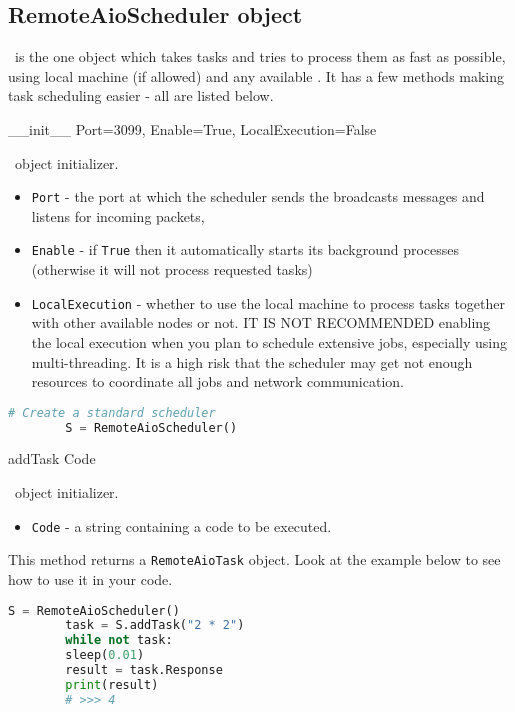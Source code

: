 \subsection{RemoteAioScheduler object}

\RemoteAioScheduler\ is the one object which takes tasks and tries to process them as fast as possible, using local machine (if allowed) and any available \RemoteAioNode. It has a few methods making task scheduling easier - all are listed below.

 {\_\_init\_\_} {Port=3099, Enable=True, LocalExecution=False} {
	\RemoteAioScheduler\ object initializer.
	\begin{itemize}
		\item \texttt{Port} - the port at which the scheduler sends the broadcasts messages and listens for incoming packets, 
		\item \texttt{Enable} - if \texttt{True} then it automatically starts its background processes (otherwise it will not process requested tasks)
		\item \texttt{LocalExecution} - whether to use the local machine to process tasks together with other available nodes or not. IT IS NOT RECOMMENDED enabling the local execution when you plan to schedule extensive jobs, especially using multi-threading. It is a high risk that the scheduler may get not enough resources to coordinate all jobs and network communication.
	\end{itemize}
}
\begin{lstlisting}[language=Python]
		# Create a standard scheduler
		S = RemoteAioScheduler()
\end{lstlisting}

 {addTask} {Code} {
	\RemoteAioScheduler\ object initializer.
	\begin{itemize}
		\item \texttt{Code} - a string containing a code to be executed.
	\end{itemize}
	This method returns a \texttt{RemoteAioTask} object. Look at the example below to see how to use it in your code.
}
\begin{lstlisting}[language=Python]
		S = RemoteAioScheduler()
		task = S.addTask("2 * 2")
		while not task:
		sleep(0.01)
		result = task.Response
		print(result)
		# >>> 4
\end{lstlisting}

